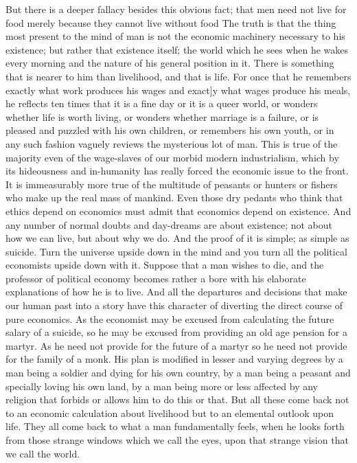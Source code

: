 But there is a deeper fallacy besides this obvious fact; that men need not live for food merely because they cannot live without food The truth is that the thing most present to the mind of man is not the economic machinery necessary to his existence; but rather that existence itself; the world which he sees when he wakes every morning and the nature of his general position in it. There is something that is nearer to him than livelihood, and that is life. For once that he remembers exactly what work produces his wages and exact]y what wages produce his meals, he reflects ten times that it is a fine day or it is a queer world, or wonders whether life is worth living, or wonders whether marriage is a failure, or is pleased and puzzled with his own children, or remembers his own youth, or in any such fashion vaguely reviews the mysterious lot of man. This is true of the majority even of the wage-slaves of our morbid modern industrialism, which by its hideousness and in-humanity has really forced the economic issue to the front. It is immeasurably more true of the multitude of peasants or hunters or fishers who make up the real mass of mankind. Even those dry pedants who think that ethics depend on economics must admit that economics depend on existence. And any number of normal doubts and day-dreams are about existence; not about how we can live, but about why we do. And the proof of it is simple; as simple as suicide. Turn the universe upside down in the mind and you turn all the political economists upside down with it. Suppose that a man wishes to die, and the professor of political economy becomes rather a bore with his elaborate explanations of how he is to live. And all the departures and decisions that make our human past into a story have this character of diverting the direct course of pure economics. As the economist may be excused from calculating the future salary of a suicide, so he may be excused from providing an old age pension for a martyr. As he need not provide for the future of a martyr so he need not provide for the family of a monk. His plan is modified in lesser and varying degrees by a man being a soldier and dying for his own country, by a man being a peasant and specially loving his own land, by a man being more or less affected by any religion that forbids or allows him to do this or that. But all these come back not to an economic calculation about livelihood but to an elemental outlook upon life. They all come back to what a man fundamentally feels, when he looks forth from those strange windows which we call the eyes, upon that strange vision that we call the world.

